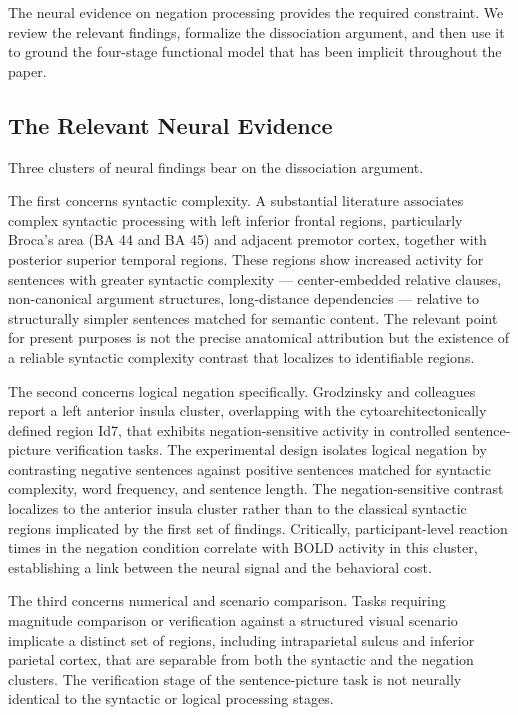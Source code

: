 \documentclass[12pt]{article}
\theoremstyle{remark}
\begin{document}
The neural evidence on negation processing provides the required
constraint. We review the relevant findings, formalize the dissociation
argument, and then use it to ground the four-stage functional model that
has been implicit throughout the paper.

\subsection{The Relevant Neural Evidence}

Three clusters of neural findings bear on the dissociation argument.

The first concerns syntactic complexity. A substantial literature
associates complex syntactic processing with left inferior frontal regions,
particularly Broca's area (BA 44 and BA 45) and adjacent premotor
cortex, together with posterior superior temporal regions. These regions
show increased activity for sentences with greater syntactic complexity
--- center-embedded relative clauses, non-canonical argument structures,
long-distance dependencies --- relative to structurally simpler sentences
matched for semantic content. The relevant point for present purposes is
not the precise anatomical attribution but the existence of a reliable
syntactic complexity contrast that localizes to identifiable regions.

The second concerns logical negation specifically. Grodzinsky and
colleagues report a left anterior insula cluster, overlapping with the
cytoarchitectonically defined region Id7, that exhibits negation-sensitive
activity in controlled sentence-picture verification tasks. The
experimental design isolates logical negation by contrasting negative
sentences against positive sentences matched for syntactic complexity,
word frequency, and sentence length. The negation-sensitive contrast
localizes to the anterior insula cluster rather than to the classical
syntactic regions implicated by the first set of findings. Critically,
participant-level reaction times in the negation condition correlate with
BOLD activity in this cluster, establishing a link between the neural
signal and the behavioral cost.

The third concerns numerical and scenario comparison. Tasks requiring
magnitude comparison or verification against a structured visual scenario
implicate a distinct set of regions, including intraparietal sulcus and
inferior parietal cortex, that are separable from both the syntactic and
the negation clusters. The verification stage of the sentence-picture
task is not neurally identical to the syntactic or logical processing
stages.
\end{document}
